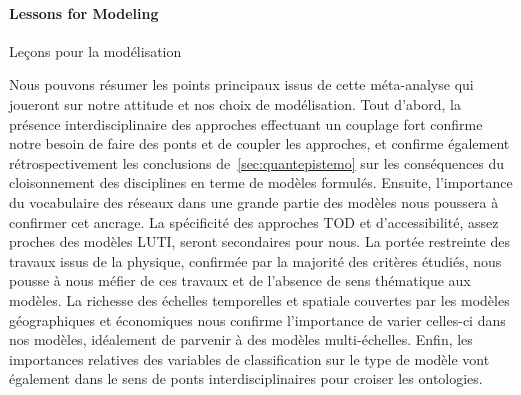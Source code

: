 


\paragraph{Lessons for Modeling}{Leçons pour la modélisation}


Nous pouvons résumer les points principaux issus de cette méta-analyse qui joueront sur notre attitude et nos choix de modélisation. Tout d'abord, la présence interdisciplinaire des approches effectuant un couplage fort confirme notre besoin de faire des ponts et de coupler les approches, et confirme également rétrospectivement les conclusions de~\ref{sec:quantepistemo} sur les conséquences du cloisonnement des disciplines en terme de modèles formulés. Ensuite, l'importance du vocabulaire des réseaux dans une grande partie des modèles nous poussera à confirmer cet ancrage. La spécificité des approches TOD et d'accessibilité, assez proches des modèles LUTI, seront secondaires pour nous. La portée restreinte des travaux issus de la physique, confirmée par la majorité des critères étudiés, nous pousse à nous méfier de ces travaux et de l'absence de sens thématique aux modèles. La richesse des échelles temporelles et spatiale couvertes par les modèles géographiques et économiques nous confirme l'importance de varier celles-ci dans nos modèles, idéalement de parvenir à des modèles multi-échelles. Enfin, les importances relatives des variables de classification sur le type de modèle vont également dans le sens de ponts interdisciplinaires pour croiser les ontologies.



